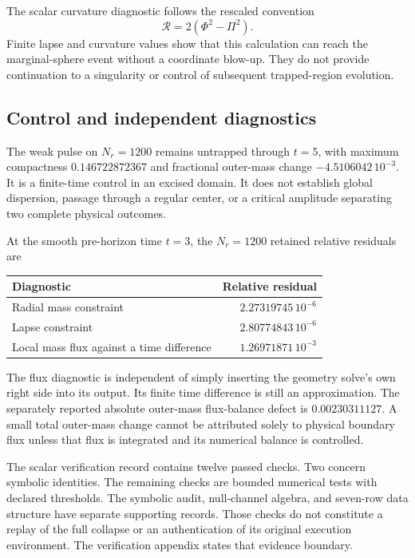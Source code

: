 The scalar curvature diagnostic follows the rescaled convention
\begin{equation}
 \mathcal R=2(\Phi^2-\Pi^2).
\end{equation}
Finite lapse and curvature values show that this calculation can reach the marginal-sphere event without a coordinate blow-up. They do not provide continuation to a singularity or control of subsequent trapped-region evolution.


\subsection{Control and independent diagnostics}
The weak pulse on $N_r=1200$ remains untrapped through $t=5$, with maximum compactness $0.146722872367$ and fractional outer-mass change $-4.5106042\,10^{-3}$. It is a finite-time control in an excised domain. It does not establish global dispersion, passage through a regular center, or a critical amplitude separating two complete physical outcomes.

At the smooth pre-horizon time $t=3$, the $N_r=1200$ retained relative residuals are
\begin{center}
\begin{tabular}{lr}
\toprule
Diagnostic&Relative residual\\
\midrule
Radial mass constraint&$2.27319745\,10^{-6}$\\
Lapse constraint&$2.80774843\,10^{-6}$\\
Local mass flux against a time difference&$1.26971871\,10^{-3}$\\
\bottomrule
\end{tabular}
\end{center}
The flux diagnostic is independent of simply inserting the geometry solve's own right side into its output. Its finite time difference is still an approximation. The separately reported absolute outer-mass flux-balance defect is $0.00230311127$. A small total outer-mass change cannot be attributed solely to physical boundary flux unless that flux is integrated and its numerical balance is controlled.

The scalar verification record contains twelve passed checks. Two concern symbolic identities. The remaining checks are bounded numerical tests with declared thresholds. The symbolic audit, null-channel algebra, and seven-row data structure have separate supporting records. Those checks do not constitute a replay of the full collapse or an authentication of its original execution environment. The verification appendix states that evidence boundary.

